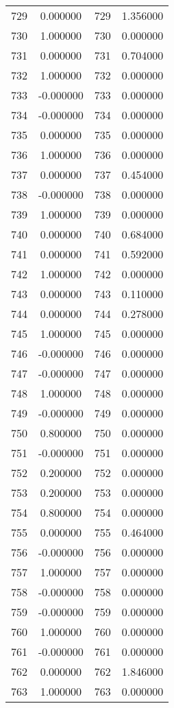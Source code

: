 \documentclass[12pt]{article}
\begin{document}
\begin{longtable}{@{}cccc@{}}
729 & 0.000000 & 729 & 1.356000 \\
730 & 1.000000 & 730 & 0.000000 \\
731 & 0.000000 & 731 & 0.704000 \\
732 & 1.000000 & 732 & 0.000000 \\
733 & -0.000000 & 733 & 0.000000 \\
734 & -0.000000 & 734 & 0.000000 \\
735 & 0.000000 & 735 & 0.000000 \\
736 & 1.000000 & 736 & 0.000000 \\
737 & 0.000000 & 737 & 0.454000 \\
738 & -0.000000 & 738 & 0.000000 \\
739 & 1.000000 & 739 & 0.000000 \\
740 & 0.000000 & 740 & 0.684000 \\
741 & 0.000000 & 741 & 0.592000 \\
742 & 1.000000 & 742 & 0.000000 \\
743 & 0.000000 & 743 & 0.110000 \\
744 & 0.000000 & 744 & 0.278000 \\
745 & 1.000000 & 745 & 0.000000 \\
746 & -0.000000 & 746 & 0.000000 \\
747 & -0.000000 & 747 & 0.000000 \\
748 & 1.000000 & 748 & 0.000000 \\
749 & -0.000000 & 749 & 0.000000 \\
750 & 0.800000 & 750 & 0.000000 \\
751 & -0.000000 & 751 & 0.000000 \\
752 & 0.200000 & 752 & 0.000000 \\
753 & 0.200000 & 753 & 0.000000 \\
754 & 0.800000 & 754 & 0.000000 \\
755 & 0.000000 & 755 & 0.464000 \\
756 & -0.000000 & 756 & 0.000000 \\
757 & 1.000000 & 757 & 0.000000 \\
758 & -0.000000 & 758 & 0.000000 \\
759 & -0.000000 & 759 & 0.000000 \\
760 & 1.000000 & 760 & 0.000000 \\
761 & -0.000000 & 761 & 0.000000 \\
762 & 0.000000 & 762 & 1.846000 \\
763 & 1.000000 & 763 & 0.000000 \\

\end{longtable}
\end{document}
